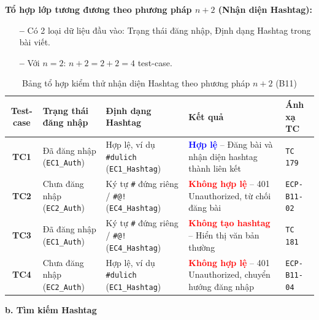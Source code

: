 \documentclass[11pt,a4paper]{article}
\begin{document}
\noindent\textbf{Tổ hợp lớp tương đương theo phương pháp $n+2$ (Nhận diện Hashtag):}
\begin{itemize}[leftmargin=1.2cm, noitemsep]
    \item[\textbf{--}] Có 2 loại dữ liệu đầu vào: Trạng thái đăng nhập, Định dạng Hashtag trong bài viết.
    \item[\textbf{--}] Với $n = 2$: $n + 2 = 2 + 2 = 4$ test-case.
\end{itemize}
\begin{table}[H]
\centering
\small
\begin{tabularx}{\textwidth}{|c|X|X|L{3.8cm}|C{2.1cm}|}
\hline
{}
\textbf{Test-case} & \textbf{Trạng thái đăng nhập} & \textbf{Định dạng Hashtag} & \textbf{Kết quả} & \textbf{Ánh xạ TC} \tabularnewline
\hline
\textbf{TC1} & Đã đăng nhập (\texttt{EC1\_Auth}) & Hợp lệ, ví dụ \texttt{\#dulich} (\texttt{EC1\_Hashtag}) & \textcolor{blue}{\textbf{Hợp lệ}} -- Đăng bài và nhận diện hashtag thành liên kết & \texttt{TC 179} \\ \hline
\textbf{TC2} & Chưa đăng nhập (\texttt{EC2\_Auth}) & Ký tự \texttt{\#} đứng riêng / \texttt{\#@!} (\texttt{EC4\_Hashtag}) & \textcolor{red}{\textbf{Không hợp lệ}} -- 401 Unauthorized, từ chối đăng bài & \texttt{ECP-B11-02} \\ \hline
\textbf{TC3} & Đã đăng nhập (\texttt{EC1\_Auth}) & Ký tự \texttt{\#} đứng riêng / \texttt{\#@!} (\texttt{EC4\_Hashtag}) & \textcolor{red}{\textbf{Không tạo hashtag}} -- Hiển thị văn bản thường & \texttt{TC 181} \\ \hline
\textbf{TC4} & Chưa đăng nhập (\texttt{EC2\_Auth}) & Hợp lệ, ví dụ \texttt{\#dulich} (\texttt{EC1\_Hashtag}) & \textcolor{red}{\textbf{Không hợp lệ}} -- 401 Unauthorized, chuyển hướng đăng nhập & \texttt{ECP-B11-04} \\ \hline
\end{tabularx}
\caption{Bảng tổ hợp kiểm thử nhận diện Hashtag theo phương pháp $n+2$ (B11)}
\end{table}

\noindent\textbf{b. Tìm kiếm Hashtag}
\end{document}
